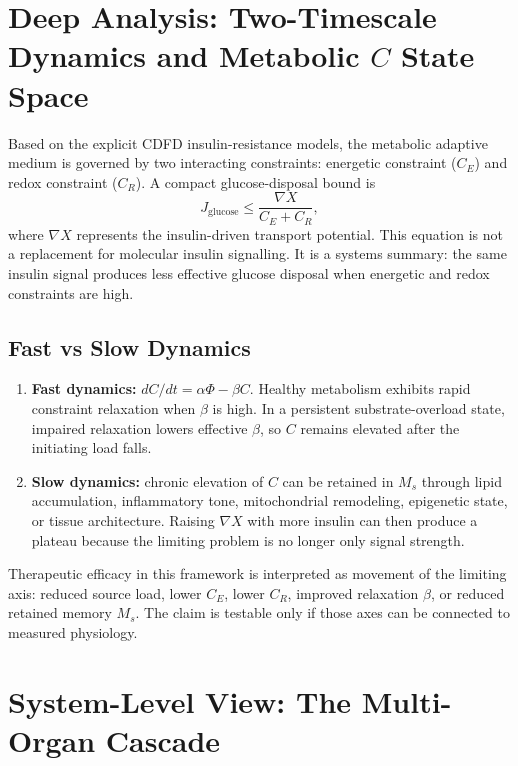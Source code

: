 \documentclass[11pt]{article}
\begin{document}

\section{Deep Analysis: Two-Timescale Dynamics and Metabolic $C$ State Space}
Based on the explicit CDFD insulin-resistance models, the metabolic adaptive medium is governed by two interacting constraints: energetic constraint ($C_E$) and redox constraint ($C_R$). A compact glucose-disposal bound is
\begin{equation}
J_{\mathrm{glucose}} \le \frac{\nabla X}{C_E + C_R},
\end{equation}
where $\nabla X$ represents the insulin-driven transport potential. This equation is not a replacement for molecular insulin signalling. It is a systems summary: the same insulin signal produces less effective glucose disposal when energetic and redox constraints are high.

\subsection{Fast vs Slow Dynamics}
\begin{enumerate}
    \item \textbf{Fast dynamics:} $dC/dt = \alpha \Phi - \beta C$. Healthy metabolism exhibits rapid constraint relaxation when $\beta$ is high. In a persistent substrate-overload state, impaired relaxation lowers effective $\beta$, so $C$ remains elevated after the initiating load falls.
    \item \textbf{Slow dynamics:} chronic elevation of $C$ can be retained in $M_s$ through lipid accumulation, inflammatory tone, mitochondrial remodeling, epigenetic state, or tissue architecture. Raising $\nabla X$ with more insulin can then produce a plateau because the limiting problem is no longer only signal strength.
\end{enumerate}

Therapeutic efficacy in this framework is interpreted as movement of the limiting axis: reduced source load, lower $C_E$, lower $C_R$, improved relaxation $\beta$, or reduced retained memory $M_s$. The claim is testable only if those axes can be connected to measured physiology.

\section{System-Level View: The Multi-Organ Cascade}
\end{document}
